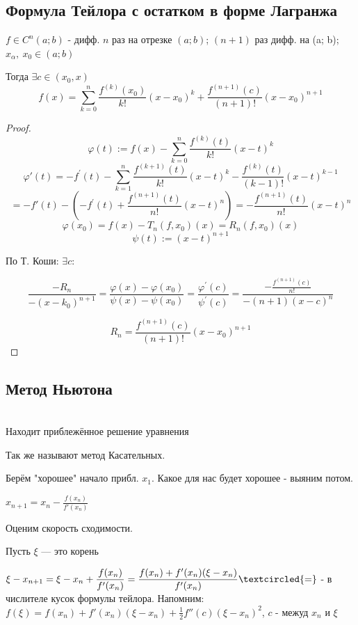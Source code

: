\subsection{Формула Тейлора с остатком в форме Лагранжа}
\begin{theorem*}
$f \in C^n (a; b)$ - дифф. $n$ раз на отрезке $(a; b)$;
$(n+1)$ раз дифф. на (a; b);
$x_\alpha,\ x_0 \in (a; b)$


Тогда $\exists c \in (x_0, x)$
$$f(x) = \sum^{n}_{k=0} \frac{f^{(k)}(x_0)}{k!}(x-x_0)^k+\frac{f^{(n+1)}(c)}{(n+1)!}(x-x_0)^{n+1}$$
\end{theorem*}
\begin{proof}
$$
\varphi(t) := f(x)-\sum_{k=0}^{n} \frac{f^{(k)}(t)}{k !}(x-t)^{k}
$$
$$
\varphi'(t)=-f^{\prime}(t)-\sum_{k=1}^{n} \frac{f^{(k+1)}(t)}{k !}(x-t)^{k}-\frac{f^{(k)}(t)}{(k-1) !}(x-t)^{k-1}
$$
$$
=-f'(t)-\left(-f^{\prime}(t)+\frac{f^{(n+1)}(t)}{n !}(x-t)^{n}\right)=-\frac{f^{(n+1)}(t)}{n !}(x-t)^{n}
$$
$$
\varphi(x_{0})=f(x)-T_{n}(f, x_{0})(x)=R_{n}(f, x_{0})(x)
$$
$$
\psi(t) := (x-t)^{n+1}
$$

По Т. Коши: $\exists c: $

$$
\frac{-R_{n}}{-\left(x-k_{0}\right)^{n+1}} = \frac{\varphi(x)-\varphi\left(x_{0}\right)}{\psi(x)-\psi\left(x_{0}\right)} = \frac{\varphi^{\prime}(c)}{\psi^{\prime}(c)}=\frac{-\frac{f^{(n+1)}(c)}{n !}}{-(n+1)(x-c)^n}
$$

$$
R_n = \frac{f^{(n+1)}(c)}{(n+1)!}(x-x_0)^{n+1}
$$

\end{proof}
\subsection{Метод Ньютона}$ $\\
Находит приблежённое решение уравнения

Так же называют метод Касательных.

Берём "хорошее" начало прибл. $x_1$. Какое для нас будет хорошее - выяним потом.

$x_{n+1} = x_n - \frac{f(x_n)}{f'(x_n)}$

Оценим скорость сходимости.

Пусть $\xi$ {---} это корень

$\displaystyle \xi - x_{n+1} = \xi - x_n + \frac{f(x_n)}{f'(x_n)} = \frac{f(x_n)+ f'(x_n)(\xi-x_n)}{f'(x_n)} \textcircled{=}$ - в числителе кусок формулы тейлора. Напомним:
$\displaystyle f(\xi) = f(x_n)+ f'(x_n)(\xi-x_n) + \frac{1}{2} f''(c)(\xi-x_n)^2$, $c$ - межуд $x_n$ и $\xi$

